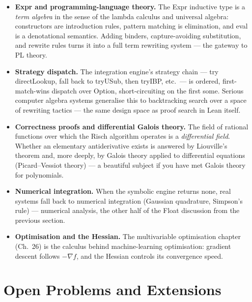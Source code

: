 \documentclass[12pt, openany]{book}
\theoremstyle{plain}
\theoremstyle{definition}
\theoremstyle{remark}
\newcommand{\li}[1]{{\ttfamily\small\color{tealaccent}#1}}
\begin{document}
\begin{itemize}
  \item \textbf{\li{Expr} and programming-language theory.}  The \li{Expr}
        inductive type is a \emph{term algebra} in the sense of the lambda
        calculus and universal algebra: constructors are introduction rules,
        pattern matching is elimination, and \li{eval} is a denotational
        semantics.  Adding binders, capture-avoiding substitution, and rewrite
        rules turns it into a full term rewriting system --- the gateway to
        PL theory.

  \item \textbf{Strategy dispatch.}  The integration engine's
        strategy chain --- try \li{directLookup}, fall back to \li{tryUSub}, then
        \li{tryIBP}, etc.\ --- is ordered, first-match-wins dispatch over
        \li{Option}, short-circuiting on the first \li{some}.  Serious computer
        algebra systems generalise this to backtracking search over a space of
        rewriting tactics --- the same design space as proof search in Lean
        itself.

  \item \textbf{Correctness proofs and differential Galois theory.}  The field
        of rational functions over which the Risch algorithm operates is a
        \emph{differential field}.  Whether an elementary antiderivative exists
        is answered by Liouville's theorem and, more deeply, by Galois theory
        applied to differential equations (Picard--Vessiot theory) --- a
        beautiful subject if you have met Galois theory for polynomials.

  \item \textbf{Numerical integration.}  When the symbolic engine returns
        \li{none}, real systems fall back to numerical integration (Gaussian
        quadrature, Simpson's rule) --- numerical analysis, the other half of
        the Float discussion from the previous section.

  \item \textbf{Optimisation and the Hessian.}  The multivariable optimisation
        chapter (Ch.\ 26) is the calculus behind machine-learning
        optimisation: gradient descent follows $-\nabla f$, and the Hessian
        controls its convergence speed.
\end{itemize}

\section{Open Problems and Extensions}
\end{document}
